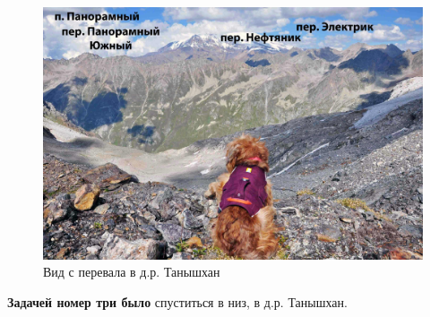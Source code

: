 \begin{figure}[h!]
	\centering
	\includegraphics[width=0.7\linewidth]{../pics/DSC_0385 2.jpg}
	\caption{Вид с перевала в д.р. Танышхан}
	\label{fig:DSC_0385 2}
\end{figure} 

\textbf{Задачей номер три было} спуститься в низ, в д.р. Танышхан. 

